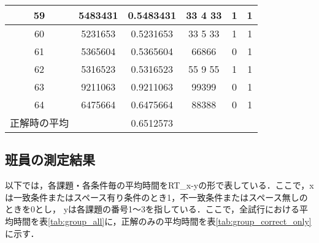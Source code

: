 \documentclass{jlreq}
\numberwithin{equation}{section}
\begin{document}
\begin{table}[H]
{\begin{tabular}{|c|c|c|c|c|c|}
      59           & 5483431          & 0.5483431      & 33   4   33 & 1     & 1   \\ \hline
      60           & 5231653          & 0.5231653      & 33   5   33 & 1     & 1   \\ \hline
      61           & 5365604          & 0.5365604      & 66866       & 0     & 1   \\ \hline
      62           & 5316523          & 0.5316523      & 55   9   55 & 1     & 1   \\ \hline
      63           & 9211063          & 0.9211063      & 99399       & 0     & 1   \\ \hline
      64           & 6475664          & 0.6475664      & 88388       & 0     & 1   \\ \hline
      正解時の平均 & ~                & 0.6512573      & ~           & ~     & ~   \\ \hline
    \end{tabular}}
  \label{tab:log_task3}
\end{table}

\begin{table}[H]
  \centering
  \caption{Task3における，条件毎の平均反応時間}
  \label{tab:RT_task3}
\end{table}

\subsection{班員の測定結果}

以下では，各課題・各条件毎の平均時間をRT\_x-yの形で表している．ここで，xは一致条件またはスペース有り条件のとき1，不一致条件またはスペース無しのときを0とし，
yは各課題の番号1～3を指している．ここで，全試行における平均時間を表\ref{tab:group_all}に，正解のみの平均時間を表\ref{tab:group_correct_only}に示す．
\end{document}

